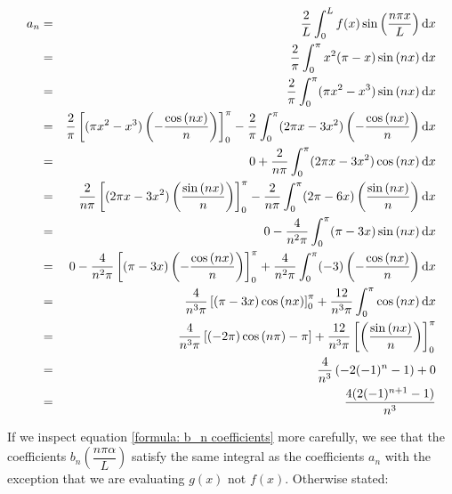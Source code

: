 \documentclass[11pt]{article}
\begin{document}
\begin{solution}
\begin{eqnarray*}
a_{n} & = & \dfrac{2}{L} \int_{0}^{L} f(x) \sin \left( \dfrac{n \pi x}{L} \right) {\rm d} x \\
& = & \dfrac{2}{\pi} \int_{0}^{\pi} x^2(\pi-x) \sin \left( n x \right) {\rm d} x \\
& = & \dfrac{2}{\pi} \int_{0}^{\pi} (\pi x^2-x^3) \sin \left( n x \right) {\rm d} x \\
& = & \dfrac{2}{\pi} \left[ (\pi x^2-x^3) \left( - \dfrac{\cos \left( n x \right)}{n} \right) \right]_{0}^{\pi}-  \dfrac{2}{\pi} \int_{0}^{\pi} (2\pi x-3x^2) \left( - \dfrac{\cos \left( n x \right)}{n} \right) {\rm d} x \\
& = & 0 +  \dfrac{2}{n\pi} \int_{0}^{\pi} (2\pi x-3x^2)\cos \left( n x \right){\rm d} x \\
& = &  \dfrac{2}{n\pi} \left[ (2\pi x-3x^2)\left(  \dfrac{\sin \left( n x \right)}{n} \right) \right]_{0}^{\pi} -  \dfrac{2}{n\pi}  \int_{0}^{\pi} (2\pi -6x)\left(  \dfrac{\sin \left( n x \right)}{n} \right){\rm d} x \\
& = &  0 -  \dfrac{4}{n^2\pi}  \int_{0}^{\pi} (\pi -3x)\sin \left( n x \right){\rm d} x \\
& = &  0 -  \dfrac{4}{n^2\pi} \left[(\pi -3x)\left( - \dfrac{\cos \left( n x \right)}{n} \right) \right]_{0}^{\pi}  + \dfrac{4}{n^2\pi} \int_{0}^{\pi} (-3)\left( - \dfrac{\cos \left( n x \right)}{n} \right){\rm d} x \\
& = &  \dfrac{4}{n^3\pi} \left[(\pi -3x)\cos \left( n x \right) \right]_{0}^{\pi}  + \dfrac{12}{n^3\pi} \int_{0}^{\pi} \cos \left( n x \right) {\rm d} x \\
& = &  \dfrac{4}{n^3\pi} \left[(-2\pi)\cos \left( n \pi \right) - \pi \right]  + \dfrac{12}{n^3\pi} \left[ \left(  \dfrac{\sin \left( n x \right)}{n} \right) \right]_{0}^{\pi} \\
& = &  \dfrac{4}{n^3} \left(-2(-1)^n - 1 \right)  + 0 \\
& = &  \dfrac{4( 2(-1)^{n+1} - 1)  }{n^3} 
\end{eqnarray*}

If we inspect equation \eqref{formula: b_n coefficients} more carefully, we see that the coefficients $b_{n} \left( \dfrac{n\pi \alpha}{L} \right)$ satisfy the same integral as the coefficients $a_{n}$ with the exception that  we are evaluating $g(x)$ not $f(x)$. Otherwise stated:


\end{solution}
\end{document}
